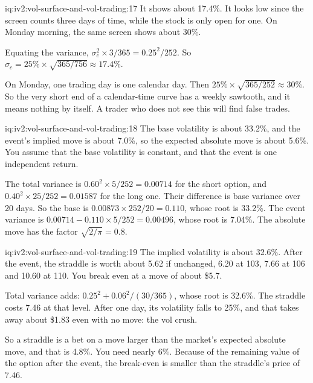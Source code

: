 \begin{solution}{iq:iv2:vol-surface-and-vol-trading:17}
It shows about 17.4\%. It looks low since the screen counts three days of time, while the stock is only open for one. On Monday morning, the same screen shows about 30\%.

Equating the variance, $\sigma_c^2 \times 3/365 = 0.25^2/252$. So $\sigma_c = 25\% \times \sqrt{365/756} \approx 17.4\%$.

On Monday, one trading day is one calendar day. Then $25\% \times \sqrt{365/252} \approx 30\%$. So the very short end of a calendar-time curve has a weekly sawtooth, and it means nothing by itself. A trader who does not see this will find false trades.

\end{solution}

\begin{solution}{iq:iv2:vol-surface-and-vol-trading:18}
The base volatility is about 33.2\%, and the event's implied move is about 7.0\%, so the expected absolute move is about 5.6\%. You assume that the base volatility is constant, and that the event is one independent return.

The total variance is $0.60^2 \times 5/252 = 0.00714$ for the short option, and $0.40^2 \times 25/252 = 0.01587$ for the long one. Their difference is base variance over 20 days. So the base is $0.00873 \times 252/20 = 0.110$, whose root is 33.2\%. The event variance is $0.00714 - 0.110 \times 5/252 = 0.00496$, whose root is 7.04\%. The absolute move has the factor $\sqrt{2/\pi} = 0.8$.

\end{solution}

\begin{solution}{iq:iv2:vol-surface-and-vol-trading:19}
The implied volatility is about 32.6\%. After the event, the straddle is worth about 5.62 if unchanged, 6.20 at 103, 7.66 at 106 and 10.60 at 110. You break even at a move of about \$5.7.

Total variance adds: $0.25^2 + 0.06^2/(30/365)$, whose root is 32.6\%. The straddle costs 7.46 at that level. After one day, its volatility falls to 25\%, and that takes away about \$1.83 even with no move: the vol crush.

So a straddle is a bet on a move larger than the market's expected absolute move, and that is 4.8\%. You need nearly 6\%. Because of the remaining value of the option after the event, the break-even is smaller than the straddle's price of 7.46.

\end{solution}

